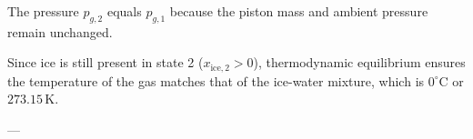 The pressure \(p_{g,2}\) equals \(p_{g,1}\) because the piston mass and ambient pressure remain unchanged.  

Since ice is still present in state 2 (\(x_{\text{ice},2} > 0\)), thermodynamic equilibrium ensures the temperature of the gas matches that of the ice-water mixture, which is \(0^\circ\text{C}\) or \(273.15 \, \text{K}\).

---